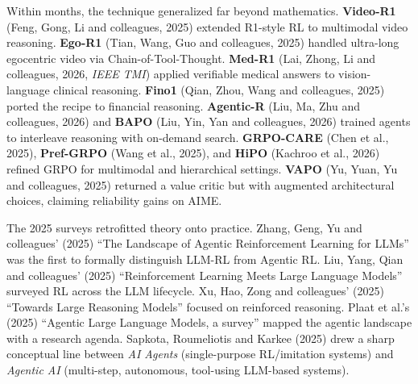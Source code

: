 Within months, the technique generalized far beyond mathematics. \textbf{Video-R1} (Feng, Gong, Li and colleagues, 2025) extended R1-style RL to multimodal video reasoning. \textbf{Ego-R1} (Tian, Wang, Guo and colleagues, 2025) handled ultra-long egocentric video via Chain-of-Tool-Thought. \textbf{Med-R1} (Lai, Zhong, Li and colleagues, 2026, \emph{IEEE TMI}) applied verifiable medical answers to vision-language clinical reasoning. \textbf{Fino1} (Qian, Zhou, Wang and colleagues, 2025) ported the recipe to financial reasoning. \textbf{Agentic-R} (Liu, Ma, Zhu and colleagues, 2026) and \textbf{BAPO} (Liu, Yin, Yan and colleagues, 2026) trained agents to interleave reasoning with on-demand search. \textbf{GRPO-CARE} (Chen et al., 2025), \textbf{Pref-GRPO} (Wang et al., 2025), and \textbf{HiPO} (Kachroo et al., 2026) refined GRPO for multimodal and hierarchical settings. \textbf{VAPO} (Yu, Yuan, Yu and colleagues, 2025) returned a value critic but with augmented architectural choices, claiming reliability gains on AIME.

The 2025 surveys retrofitted theory onto practice. Zhang, Geng, Yu and colleagues' (2025) ``The Landscape of Agentic Reinforcement Learning for LLMs'' was the first to formally distinguish LLM-RL from Agentic RL. Liu, Yang, Qian and colleagues' (2025) ``Reinforcement Learning Meets Large Language Models'' surveyed RL across the LLM lifecycle. Xu, Hao, Zong and colleagues' (2025) ``Towards Large Reasoning Models'' focused on reinforced reasoning. Plaat et al.'s (2025) ``Agentic Large Language Models, a survey'' mapped the agentic landscape with a research agenda. Sapkota, Roumeliotis and Karkee (2025) drew a sharp conceptual line between \emph{AI Agents} (single-purpose RL/imitation systems) and \emph{Agentic AI} (multi-step, autonomous, tool-using LLM-based systems).

